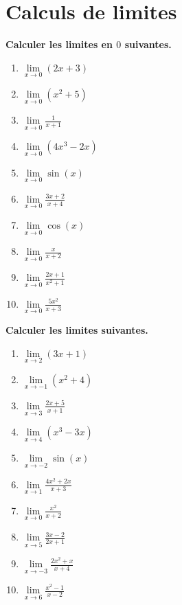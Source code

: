 \documentclass[11pt]{article}
\begin{document}
\vspace{-1cm}
\section{Calculs de limites}

\begin{multicols}{2}
  \begin{exercice}
    \textbf{Calculer les limites en $0$ suivantes.}
    \begin{enumerate}
    \item \(\lim\limits_{x \to 0} (2x + 3)\)
    \item \(\lim\limits_{x \to 0} (x^2 + 5)\)
    \item \(\lim\limits_{x \to 0} \frac{1}{x + 1}\)
    \item \(\lim\limits_{x \to 0} (4x^3 - 2x)\)
    \item \(\lim\limits_{x \to 0} \sin(x)\)
    \item \(\lim\limits_{x \to 0} \frac{3x + 2}{x + 4}\)
    \item \(\lim\limits_{x \to 0} \cos(x)\)
    \item \(\lim\limits_{x \to 0} \frac{x}{x + 2}\)
    \item \(\lim\limits_{x \to 0} \frac{2x + 1}{x^2 + 1}\)
    \item \(\lim\limits_{x \to 0} \frac{5x^2}{x + 3}\)
    \end{enumerate}
  \end{exercice}

\begin{exercice}
  \textbf{Calculer les limites suivantes.}
  \begin{enumerate}
  \item \(\lim\limits_{x \to 2} (3x + 1)\)
  \item \(\lim\limits_{x \to -1} (x^2 + 4)\)
  \item \(\lim\limits_{x \to 3} \frac{2x + 5}{x + 1}\)
  \item \(\lim\limits_{x \to 4} (x^3 - 3x)\)
  \item \(\lim\limits_{x \to -2} \sin(x)\)
  \item \(\lim\limits_{x \to 1} \frac{4x^2 + 2x}{x + 3}\)
  \item \(\lim\limits_{x \to 0} \frac{x^2}{x + 2}\)
  \item \(\lim\limits_{x \to 5} \frac{3x - 2}{2x + 1}\)
  \item \(\lim\limits_{x \to -3} \frac{2x^2 + x}{x + 4}\)
  \item \(\lim\limits_{x \to 6} \frac{x^2 - 1}{x - 2}\)
  \end{enumerate}
\end{exercice}
\end{multicols}
\end{document}
